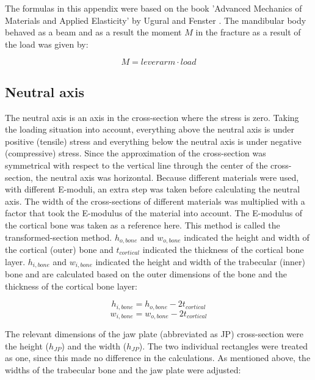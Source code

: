 \begin{subappendices}
\noindent The formulas in this appendix were based on the book 'Advanced Mechanics of Materials and Applied Elasticity' by Ugural and Fenster \cite{beamtheory}. The mandibular body behaved as a beam and as a result the moment $M$ in the fracture as a result of the load was given by: 

\begin{equation}
M=lever arm\cdot load
\end{equation} 

\subsection{Neutral axis}

The neutral axis is an axis in the cross-section where the stress is zero. Taking the loading situation into account, everything above the neutral axis is under positive (tensile) stress and everything below the neutral axis is under negative (compressive) stress. Since the approximation of the cross-section was symmetrical with respect to the vertical line through the center of the cross-section, the neutral axis was horizontal. Because different materials were used, with different E-moduli, an extra step was taken before calculating the neutral axis. The width of the cross-sections of different materials was multiplied with a factor that took the E-modulus of the material into account. The E-modulus of the cortical bone was taken as a reference here. This method is called the transformed-section method. $h_{o,bone}$ and $w_{o,bone}$ indicated the height and width of the cortical (outer) bone and $t_{cortical}$ indicated the thickness of the cortical bone layer. $h_{i,bone}$ and $w_{i,bone}$ indicated the height and width of the trabecular (inner) bone and are calculated based on the outer dimensions of the bone and the thickness of the cortical bone layer:

\begin{equation}
h_{i,bone}=h_{o,bone}-2t_{cortical}
\end{equation}
\begin{equation}
w_{i,bone}=w_{o,bone}-2t_{cortical}
\end{equation}

\noindent The relevant dimensions of the jaw plate (abbreviated as JP) cross-section were the height ($h_{JP}$) and the width ($h_{JP}$). The two individual rectangles were treated as one, since this made no difference in the calculations. As mentioned above, the widths of the trabecular bone and the jaw plate were adjusted: 


\end{subappendices}

